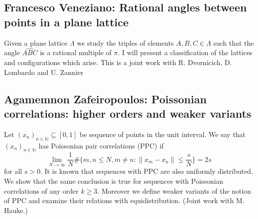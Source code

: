 \documentclass[15pt]{article}
\newcommand{\xn}{(x_n)_{n \in \mathbb{N}} }
\begin{document}
\subsection*{Francesco Veneziano: Rational angles between points in a plane lattice}

Given a plane lattice $\Lambda$ we study the triples of elements $A,B,C\in
\Lambda$ such that the angle $\hat{ABC}$  is a rational multiple of $\pi$.
I will present a classification of the lattices and configurations which
arise. This is a joint work with R. Dvornicich, D. Lombardo and U. Zannier

\subsection*{Agamemnon Zafeiropoulos: Poissonian correlations: higher orders and weaker variants}

Let $\xn \subseteq [0,1]$ be sequence of points in the unit interval. We say that $\xn$ has Poissonian pair correlations (PPC) if \[ \lim_{N\to \infty} \frac{1}{N}\#\Big\{ m,n\leqslant N, m\neq n : \|x_m-x_n\| \leqslant \frac{s}{N} \Big\} = 2s  \]
for all $s>0.$ It is known that sequences with PPC are also uniformly distributed. We show that the same conclusion is true for sequences with Poissonian correlations of any order $k\geqslant 3.$ Moreover we define weaker variants of the notion of PPC and examine their relations with equidistribution. (Joint work with M. Hauke.) 
\end{document}
